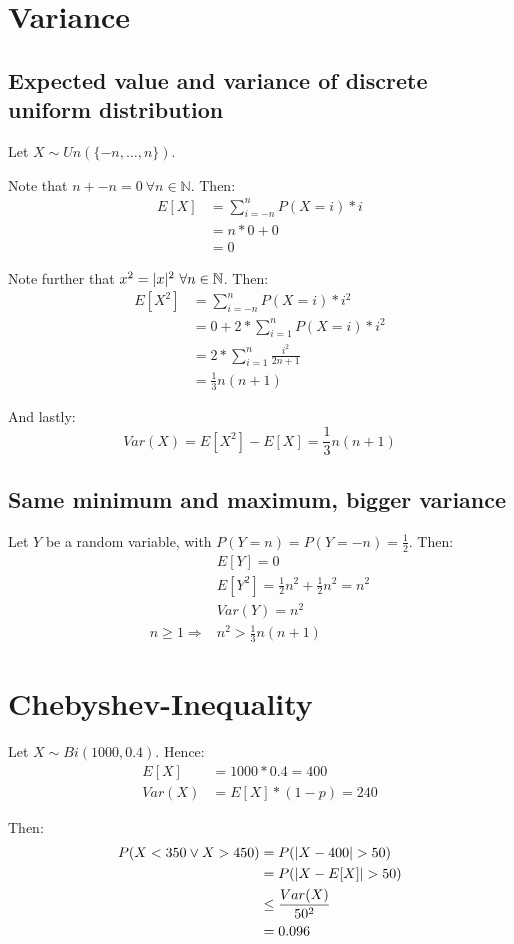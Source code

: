 \documentclass[a4paper]{scrreprt}
\DeclarePairedDelimiter\abs{\lvert}{\rvert}
\begin{document}
\section{Variance}

\subsection{Expected value and variance of discrete uniform distribution}

Let $X \sim Un(\{-n, \ldots, n\})$.

Note that $n + -n = 0\ \forall n \in \mathbb{N}$. Then:
\begin{align*}
	E[X] & = \sum_{i=-n}^n{P(X=i) * i} \\
	& = n * 0 + 0 \\
	& = 0
\end{align*}

Note further that $x^2 = \abs{x}^2\ \forall n \in \mathbb{N}$. Then:
\begin{align*}
	E[X^2] & = \sum_{i=-n}^n{P(X = i) * i^2} \\
	& = 0 + 2 * \sum_{i=1}^n{P(X = i) * i^2} \\
	& = 2 * \sum_{i=1}^n{\frac{i^2}{2n + 1}} \\
	& = \frac{1}{3} n (n + 1)
\end{align*}

And lastly:
\[
	Var(X) = E[X^2] - E[X] = \frac{1}{3} n (n+1)
\]

\subsection{Same minimum and maximum, bigger variance}

Let $Y$ be a random variable, with $P(Y = n) = P(Y = -n) = \frac{1}{2}$. Then:
\begin{align*}
	& E[Y] = 0 \\
	& E[Y^2] = \frac{1}{2} n^2 + \frac{1}{2} n^2 = n^2 \\
	& Var(Y) = n^2 \\
	n \geq 1 \Rightarrow & n^2 > \frac{1}{3} n (n + 1)
\end{align*}

\section{Chebyshev-Inequality}

Let $X \sim Bi(1000, 0.4)$. Hence:
\begin{align*}
	E[X] & = 1000 * 0.4 = 400 \\
	Var(X) & = E[X] * (1-p) = 240
\end{align*}

Then:
\begin{align*}
	P(X < 350 \lor X > 450) & = P(\abs{X - 400} > 50) \\
				& = P(\abs{X - E[X]} > 50) \\
	   & \leq \frac{Var(X)}{50^2} \\
	   & = 0.096
\end{align*}
\end{document}
